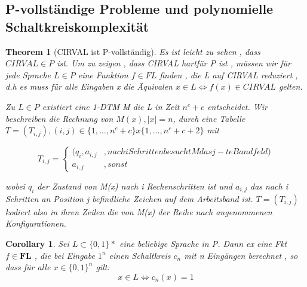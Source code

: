 \documentclass{article}
\newtheorem{theorem}{Theorem}
\newtheorem{corollary}{Corollary}[theorem]
\begin{document}
	\subsection{P-vollständige Probleme und polynomielle Schaltkreiskomplexität}
		\begin{theorem}[CIRVAL ist P-vollständig]
			Es ist leicht zu sehen , dass $CIRVAL \in P$ ist. Um zu zeigen , dass CIRVAL hartfür P ist , müssen wir für jede Sprache $L \in P$ eine Funktion $f \in FL$ finden , die L auf CIRVAL reduziert , d.h es muss für alle Eingaben x die Äquivalen $x\in L \iff f(x) \in  CIRVAL$ gelten.


			Zu $L \in P$ existiert eine 1-DTM M die L in Zeit $n^c+c$ entscheidet. Wir beschreiben die Rechnung von $M(x) ,  |x| =n $, durch eine Tabelle $T=(T_{i,j}) , (i,j) \in \{ 1, \dots , n^c+c \} x \{ 1 , \dots , n^c+c+2\}$
			mit 

			\[
				T_{i,j} = \begin{cases}
								(q_i , a_{i,j}&, nach i Schritten besucht M das j-te Bandfeld)\\
								a_{i,j} &, sonst
							\end{cases}
			\]

			wobei $q_i$ der Zustand von M(x) nach i Rechenschritten ist und $a_{i,j}$ das nach i Schritten an Position j befindliche Zeichen auf dem Arbeitsband ist. $T = (T_{i,j})$ kodiert also in ihren Zeilen die von M(x) der Reihe nach angenommenen Konfigurationen.

		\end{theorem}

		\begin{corollary}
			Sei $L \subset \{0,1\}*$ eine beliebige Sprache in P. Dann ex eine Fkt $f \in \textbf{FL}$ , die bei Eingabe $1^n$ einen Schaltkreis $c_n$ mit n Eingängen berechnet , so dass für alle $x\in \{0,1\}^n$ gilt:
				\[
					x \in L \iff c_n(x) = 1 
				\] 

		\end{corollary}

\end{document}
